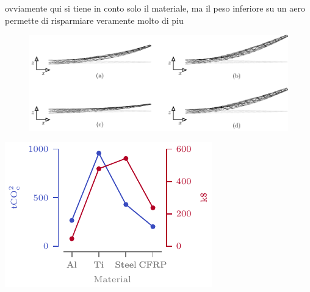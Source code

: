 ovviamente qui si tiene in conto solo il materiale, ma il peso inferiore su un aero permette di risparmiare veramente molto di piu

\begin{figure}
    \centering
    \includegraphics[width=\linewidth]{figures/07_aeronautic/00_materials/mat.pdf}
     \caption{}
    \label{fig:07_mat_sol}
\end{figure}


\begin{marginfigure}
    \centering
    \includegraphics[width=\linewidth]{figures/07_aeronautic/00_co2eq/co2_dollar.pdf}
    \caption{}
    \label{fig:07}
\end{marginfigure}


